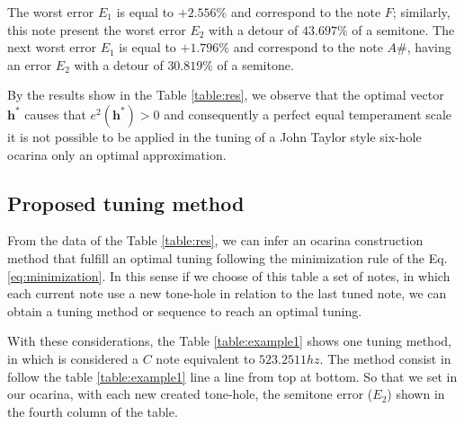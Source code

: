 \documentclass[11pt,twocolumn]{article}
\begin{document}
The worst error $E_1$ is equal to $+2.556\%$ and correspond to the note $F$; 
similarly, this note present the worst error $E_2$ with a detour of $43.697\%$ of a semitone. 
The next worst error $E_1$ is equal to $+1.796\%$ and correspond to the note $A\#$,
having an error $E_2$ with a detour of $30.819\%$ of a semitone.

By the results show in the Table \ref{table:res}, we observe that 
the optimal vector $\mathbf{h^*}$ causes that $e^2(\mathbf{h^*})> 0$
and consequently a perfect equal temperament scale 
it is not possible to be applied in the tuning of a John Taylor style six-hole ocarina
only an optimal approximation. 

\subsection{Proposed tuning method}
From the data of the Table \ref{table:res}, 
we can infer an ocarina construction method that fulfill 
an optimal tuning following the minimization rule of the Eq. \ref{eq:minimization}.
In this sense if we choose of this table a set of notes, 
in which each current note use a new tone-hole in relation to the last tuned note, 
we can obtain a tuning method or sequence to reach an optimal tuning.

With these considerations, the Table \ref{table:example1} shows one tuning method, 
in which is considered a $C$ note equivalent to $523.2511 hz$.
The method consist in follow the table \ref{table:example1} line a line from top at bottom. 
So that we set in our ocarina, with each new created tone-hole, 
the semitone error ($E_2$) shown in the fourth column of the table.
\end{document}
